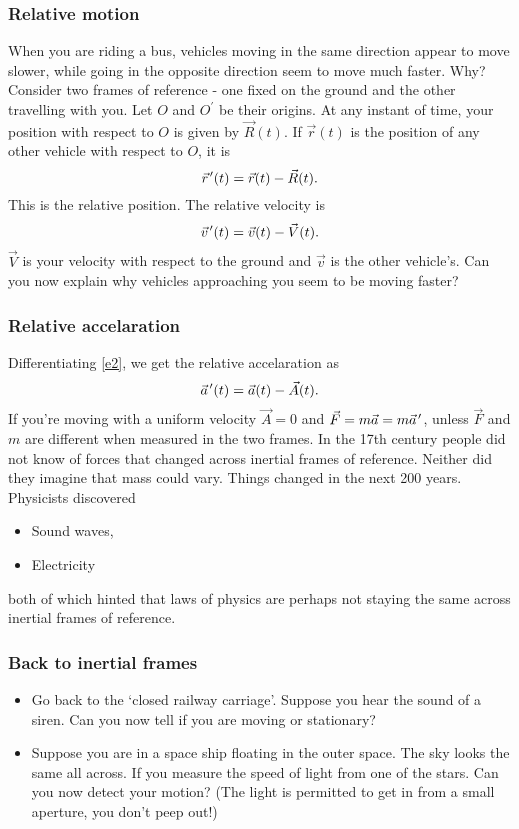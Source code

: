 \documentclass{beamer}
\newcommand{\pvec}[1]{\vec{#1}\mkern2mu\vphantom{#1}}
\begin{document}
\begin{frame}
\frametitle{Relative motion}
When you are riding a bus, vehicles moving in the same direction appear
to move slower, while going in the opposite direction seem to move much faster.
Why? Consider two frames of reference - one fixed on the ground and the other
travelling with you. Let $O$ and $O^\prime$ be their origins. At any instant of
time, your position with respect to $O$ is given by $\vec{R}(t)$. If 
$\vec{r}(t)$ is the position of any other vehicle with respect to $O$, it is
\begin{equation}\label{e1}
\pvec{r}^\prime(t) = \vec{r}(t) - \vec{R}(t).
\end{equation}
This is the relative position. The relative velocity is
\begin{equation}\label{e2}
\pvec{v}^\prime(t) = \vec{v}(t) - \vec{V}(t).
\end{equation}
$\vec{V}$ is your velocity with respect to the ground and $\vec{v}$ is the other
vehicle's. Can you now explain why vehicles approaching you seem to be moving
faster?
\end{frame}

\begin{frame}
\frametitle{Relative accelaration}
Differentiating \eqref{e2}, we get the relative accelaration as
\begin{equation}\label{e3}
\pvec{a}^\prime(t) = \vec{a}(t) - \vec{A}(t).
\end{equation}
If you're moving with a uniform velocity $\vec{A} = 0$ and $\vec{F} = m\vec{a}
= m\pvec{a}^\prime$, unless $\vec{F}$ and $m$ are different when measured in 
the two frames. In the 17th century people did not know of forces that changed
across inertial frames of reference. Neither did they imagine that mass could
vary. Things changed in the next 200 years. Physicists discovered
\begin{itemize}
\item Sound waves,
\item Electricity
\end{itemize}
both of which hinted that laws of physics are perhaps not staying the same
across inertial frames of reference.
\end{frame}

\begin{frame}
\frametitle{Back to inertial frames}
\begin{itemize}
\item Go back to the `closed railway carriage'. Suppose you hear the sound of 
a siren. Can you now tell if you are moving or stationary?
\item Suppose you are in a space ship floating in the outer space. The sky looks
the same all across. If you measure the speed of light from one of the stars. 
Can you now detect your motion? (The light is permitted to get in from a small
aperture, you don't peep out!)
\end{itemize}
\end{frame}
\end{document}
